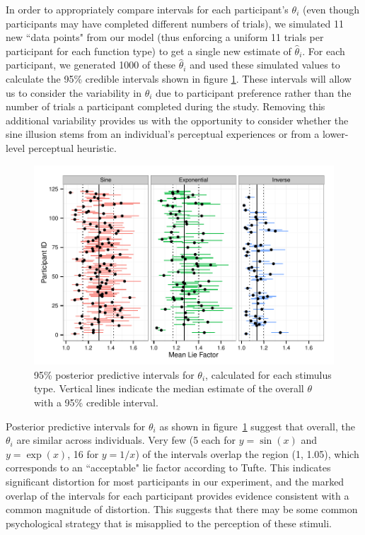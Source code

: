 \documentclass[11pt]{isuthesis}\usepackage[]{graphicx}\usepackage[]{color}
\begin{document}
In order to appropriately compare intervals for each participant's $\theta_i$ (even though participants may have completed different numbers of trials), we simulated 11 new ``data points" from our model (thus enforcing a uniform 11 trials per participant for each function type) to get a single new estimate of $\hat\theta_i$. For each participant, we generated 1000 of these $\hat\theta_i$ and used these simulated values to calculate the 95\% credible intervals shown in figure \ref{fig:indivCIs}. These intervals will allow us to consider the variability in $\theta_i$ due to participant preference rather than the number of trials a participant completed during the study. Removing this additional variability provides us with the opportunity to consider whether the sine illusion stems from an individual's perceptual experiences or from a lower-level perceptual heuristic. 

\begin{figure}\centering
\includegraphics[width=.8\linewidth, trim=0in .1in 0in .1in]{fig-CIindivMean}
\caption[Individual-level posterior predictive intervals for theta]{95\% posterior predictive intervals for $\theta_i$, calculated for each stimulus type. Vertical lines indicate the median estimate of the overall $\theta$ with a 95\% credible interval.}\label{fig:indivCIs}
\end{figure}

Posterior predictive intervals for $\theta_i$ as shown in figure~\ref{fig:indivCIs} suggest that overall, the $\theta_i$ are similar across individuals. Very few (5 each for $y=\sin(x)$ and $y=\exp(x)$, 16 for $y=1/x$) of the intervals overlap the region (1, 1.05), which corresponds to an ``acceptable" lie factor according to Tufte. This indicates significant distortion for most participants in our experiment, and the marked overlap of the intervals for each participant provides evidence consistent with a common magnitude of distortion. This suggests that there may be some common psychological strategy that is misapplied to the perception of these stimuli. 
\end{document}
